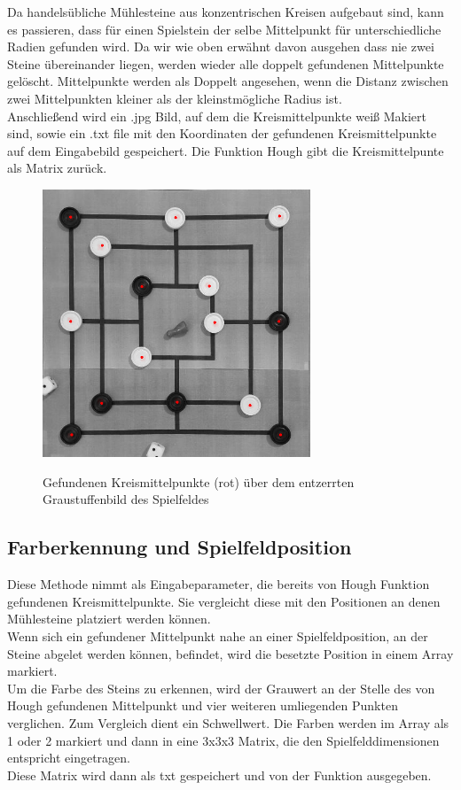 \documentclass[paper=A4, deutsch]{scrartcl}
\begin{document}
Da handelsübliche Mühlesteine aus konzentrischen Kreisen aufgebaut sind, kann es passieren, dass für einen Spielstein der selbe Mittelpunkt für unterschiedliche Radien gefunden wird.  Da wir wie oben erwähnt davon ausgehen dass nie zwei Steine übereinander liegen, werden wieder alle doppelt gefundenen Mittelpunkte gelöscht. Mittelpunkte werden als Doppelt angesehen, wenn die Distanz zwischen zwei Mittelpunkten kleiner als der kleinstmögliche Radius ist. \\

Anschließend wird ein .jpg Bild, auf dem die Kreismittelpunkte weiß Makiert sind, sowie ein .txt file mit den Koordinaten der gefundenen Kreismittelpunkte auf dem Eingabebild gespeichert. Die Funktion Hough gibt die Kreismittelpunte als Matrix zurück. \\ 

\begin{figure}[ht]
	\centering
		\includegraphics[width=8cm]{hough_performance.jpg}\\
	\caption[Gefundenen Kreismittelpunkte (rot) über dem entzerrten Graustuffenbild des Spielfeldes]{Gefundenen Kreismittelpunkte (rot) über dem entzerrten Graustuffenbild des Spielfeldes}
	\label{fig:hougresult}
\end{figure}


\subsection{Farberkennung und Spielfeldposition}
Diese Methode nimmt als Eingabeparameter, die bereits von Hough Funktion gefundenen Kreismittelpunkte. Sie vergleicht diese mit den Positionen an denen Mühlesteine platziert werden können.\\
Wenn sich ein gefundener Mittelpunkt nahe an einer Spielfeldposition, an der Steine abgelet werden können,  befindet,  wird die besetzte Position in einem Array markiert. \\
Um die Farbe des Steins zu erkennen, wird der Grauwert an der Stelle des von Hough gefundenen Mittelpunkt und vier weiteren umliegenden Punkten verglichen. Zum Vergleich dient ein Schwellwert. Die Farben werden  im Array als 1 oder 2 markiert und dann in eine 3x3x3 Matrix, die den Spielfelddimensionen entspricht eingetragen.\\
Diese Matrix wird dann als txt gespeichert und von der Funktion ausgegeben.
\end{document}
